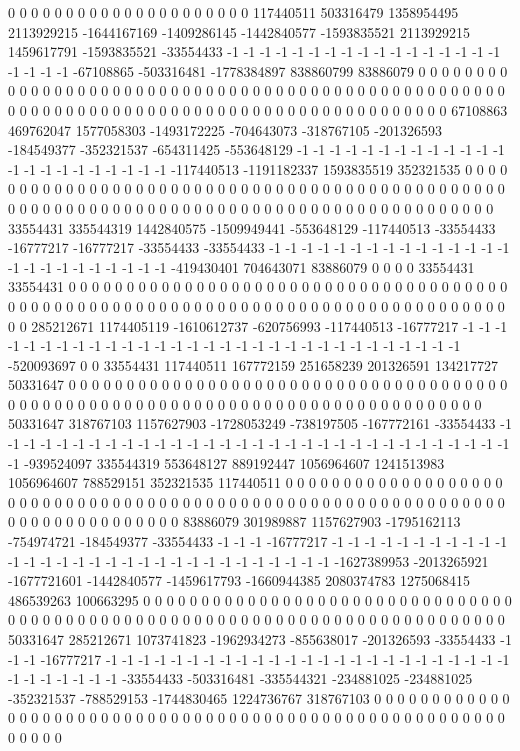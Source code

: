 0 0 0 0 0 0 0 0 0 0 0 0 0 0 0 0 0 0 0 0 0 117440511 503316479 1358954495 2113929215 -1644167169 -1409286145 -1442840577 -1593835521 2113929215 1459617791 -1593835521 -33554433 -1 -1 -1 -1 -1 -1 -1 -1 -1 -1 -1 -1 -1 -1 -1 -1 -1 -1 -1 -1 -1 -67108865 -503316481 -1778384897 838860799 83886079 0 0 0 0 0 0 0 0 0 0 0 0 0 0 0 0 0 0 0 0 0 0 0 0 0 0 0 0 0 0 0 0 0 0 0 0 0 0 0 0 0 0 0 0 0 0 0 0 0 0 0 0 0 0 0 0 0 0 0 0 0 0 0 0 0 0 0 0 0
0 0 0 0 0 0 0 0 0 0 0 0 0 0 0 0 0 0 0 0 67108863 469762047 1577058303 -1493172225 -704643073 -318767105 -201326593 -184549377 -352321537 -654311425 -553648129 -1 -1 -1 -1 -1 -1 -1 -1 -1 -1 -1 -1 -1 -1 -1 -1 -1 -1 -1 -1 -1 -1 -1 -117440513 -1191182337 1593835519 352321535 0 0 0 0 0 0 0 0 0 0 0 0 0 0 0 0 0 0 0 0 0 0 0 0 0 0 0 0 0 0 0 0 0 0 0 0 0 0 0 0 0 0 0 0 0 0 0 0 0 0 0 0 0 0 0 0 0 0 0 0 0 0 0 0 0 0 0 0 0 0
0 0 0 0 0 0 0 0 0 0 0 0 0 0 0 0 0 0 0 33554431 335544319 1442840575 -1509949441 -553648129 -117440513 -33554433 -16777217 -16777217 -33554433 -33554433 -1 -1 -1 -1 -1 -1 -1 -1 -1 -1 -1 -1 -1 -1 -1 -1 -1 -1 -1 -1 -1 -1 -1 -1 -1 -419430401 704643071 83886079 0 0 0 0 33554431 33554431 0 0 0 0 0 0 0 0 0 0 0 0 0 0 0 0 0 0 0 0 0 0 0 0 0 0 0 0 0 0 0 0 0 0 0 0 0 0 0 0 0 0 0 0 0 0 0 0 0 0 0 0 0 0 0 0 0 0 0 0 0 0 0 0
0 0 0 0 0 0 0 0 0 0 0 0 0 0 0 0 0 0 0 285212671 1174405119 -1610612737 -620756993 -117440513 -16777217 -1 -1 -1 -1 -1 -1 -1 -1 -1 -1 -1 -1 -1 -1 -1 -1 -1 -1 -1 -1 -1 -1 -1 -1 -1 -1 -1 -1 -1 -1 -1 -520093697 0 0 33554431 117440511 167772159 251658239 201326591 134217727 50331647 0 0 0 0 0 0 0 0 0 0 0 0 0 0 0 0 0 0 0 0 0 0 0 0 0 0 0 0 0 0 0 0 0 0 0 0 0 0 0 0 0 0 0 0 0 0 0 0 0 0 0 0 0 0 0 0 0 0 0 0 0 0
0 0 0 0 0 0 0 0 0 0 0 0 0 0 0 0 0 50331647 318767103 1157627903 -1728053249 -738197505 -167772161 -33554433 -1 -1 -1 -1 -1 -1 -1 -1 -1 -1 -1 -1 -1 -1 -1 -1 -1 -1 -1 -1 -1 -1 -1 -1 -1 -1 -1 -1 -1 -1 -1 -1 -1 -939524097 335544319 553648127 889192447 1056964607 1241513983 1056964607 788529151 352321535 117440511 0 0 0 0 0 0 0 0 0 0 0 0 0 0 0 0 0 0 0 0 0 0 0 0 0 0 0 0 0 0 0 0 0 0 0 0 0 0 0 0 0 0 0 0 0 0 0 0 0 0 0 0 0 0 0 0 0 0 0 0 0
0 0 0 0 0 0 0 0 0 0 0 0 0 0 0 0 83886079 301989887 1157627903 -1795162113 -754974721 -184549377 -33554433 -1 -1 -1 -16777217 -1 -1 -1 -1 -1 -1 -1 -1 -1 -1 -1 -1 -1 -1 -1 -1 -1 -1 -1 -1 -1 -1 -1 -1 -1 -1 -1 -1 -1 -1 -1 -1627389953 -2013265921 -1677721601 -1442840577 -1459617793 -1660944385 2080374783 1275068415 486539263 100663295 0 0 0 0 0 0 0 0 0 0 0 0 0 0 0 0 0 0 0 0 0 0 0 0 0 0 0 0 0 0 0 0 0 0 0 0 0 0 0 0 0 0 0 0 0 0 0 0 0 0 0 0 0 0 0 0 0 0 0 0
0 0 0 0 0 0 0 0 0 0 0 0 0 0 0 50331647 285212671 1073741823 -1962934273 -855638017 -201326593 -33554433 -1 -1 -1 -16777217 -1 -1 -1 -1 -1 -1 -1 -1 -1 -1 -1 -1 -1 -1 -1 -1 -1 -1 -1 -1 -1 -1 -1 -1 -1 -1 -1 -1 -1 -1 -1 -1 -33554433 -503316481 -335544321 -234881025 -234881025 -352321537 -788529153 -1744830465 1224736767 318767103 0 0 0 0 0 0 0 0 0 0 0 0 0 0 0 0 0 0 0 0 0 0 0 0 0 0 0 0 0 0 0 0 0 0 0 0 0 0 0 0 0 0 0 0 0 0 0 0 0 0 0 0 0 0 0 0 0 0 0 0
